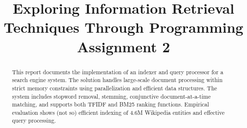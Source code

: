 
\title[Exploring IR Techniques Through PA 2]{Exploring Information Retrieval Techniques Through Programming Assignment 2} %

\begin{abstract}
  This report documents the implementation of an indexer and query processor for a search engine system. The solution handles large-scale document processing within strict memory constraints using parallelization and efficient data structures. The system includes stopword removal, stemming, conjunctive document-at-a-time matching, and supports both TFIDF and BM25 ranking functions. Empirical evaluation shows (not so) efficient indexing of 4.6M Wikipedia entities and effective query processing.
\end{abstract}




\maketitle

